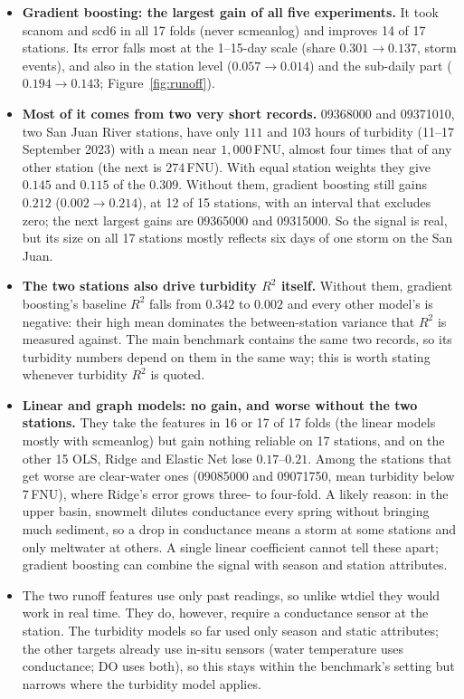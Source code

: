 \documentclass[11pt]{article}
\newcommand{\codeus}{\textunderscore\allowbreak}
\newcommand{\code}[1]{{\ttfamily\let\_\codeus #1}}
\begin{document}
\begin{itemize}
  \item \textbf{Gradient boosting: the largest gain of all five experiments.} It took
        \code{sc\_anom} and \code{sc\_d6} in all 17 folds (never \code{sc\_mean\_log}) and
        improves 14 of 17 stations. Its error falls most at the 1--15-day scale (share
        $0.301\to0.137$, storm events), and also in the station level ($0.057\to0.014$) and the
        sub-daily part ($0.194\to0.143$; Figure~\ref{fig:runoff}).
  \item \textbf{Most of it comes from two very short records.} 09368000 and 09371010, two San
        Juan River stations, have only $111$ and $103$ hours of turbidity (11--17 September 2023)
        with a mean near $1{,}000$\,FNU, almost four times that of any other station (the next is
        $274$\,FNU). With equal station
        weights they give $0.145$ and $0.115$ of the $0.309$. Without them, gradient boosting
        still gains $0.212$ ($0.002\to0.214$), at 12 of 15 stations, with an interval that
        excludes zero; the next largest gains are 09365000 and 09315000. So the signal is real,
        but its size on all 17 stations mostly reflects six days of one storm on the San Juan.
  \item \textbf{The two stations also drive turbidity $R^2$ itself.} Without them, gradient
        boosting's baseline $R^2$ falls from $0.342$ to $0.002$ and every other model's is
        negative: their high mean dominates the between-station variance that $R^2$ is measured
        against. The main benchmark contains the same two records, so its turbidity numbers depend
        on them in the same way; this is worth stating whenever turbidity $R^2$ is quoted.
  \item \textbf{Linear and graph models: no gain, and worse without the two stations.} They take
        the features in 16 or 17 of 17 folds (the linear models mostly with \code{sc\_mean\_log}) but
        gain nothing reliable on 17 stations, and on the other 15 OLS, Ridge and Elastic Net lose
        $0.17$--$0.21$. Among the stations that get worse are clear-water ones (09085000 and
        09071750, mean turbidity below $7$\,FNU), where Ridge's error grows three- to four-fold. A likely reason: in the
        upper basin, snowmelt dilutes conductance every spring without bringing much sediment,
        so a drop in conductance means a storm at some stations and only meltwater at others. A
        single linear coefficient cannot tell these apart; gradient boosting can combine the
        signal with season and station attributes.
  \item The two runoff features use only past readings, so unlike \code{wt\_diel} they would work
        in real time. They do, however, require a conductance sensor at the station. The turbidity
        models so far used only season and static attributes; the other targets already use
        in-situ sensors (water temperature uses conductance; DO uses both), so this stays within
        the benchmark's setting but narrows where the turbidity model applies.
\end{itemize}
\end{document}
